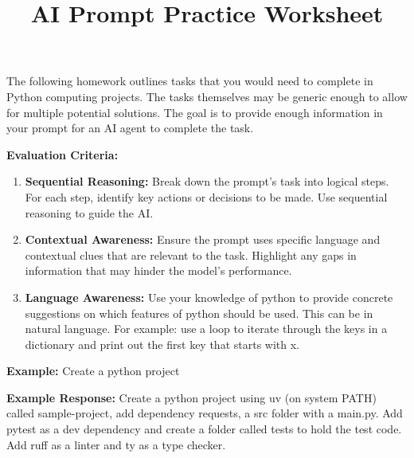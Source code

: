\documentclass[12pt]{article}
\title{\textbf{AI Prompt Practice Worksheet}}
\date{}
\begin{document}
\maketitle
\thispagestyle{empty}

\begin{mdframed}
The following homework outlines tasks that you would need to complete in Python computing projects. The tasks themselves may be generic enough to allow for multiple potential solutions. The goal is to provide enough information in your prompt for an AI agent to complete the task.

\medskip
\noindent\textbf{Evaluation Criteria:}
\begin{enumerate}[leftmargin=*, label=\arabic*.]
    \item \textbf{Sequential Reasoning:} Break down the prompt's task into logical steps. For each step, identify key actions or decisions to be made. Use sequential reasoning to guide the AI.

    \item \textbf{Contextual Awareness:} Ensure the prompt uses specific language and contextual clues that are relevant to the task. Highlight any gaps in information that may hinder the model's performance.
    
     \item \textbf{Language Awareness:} Use your knowledge of python to provide concrete suggestions on which features of python should be used.  This can be in natural language.  For example: use a loop to iterate through the keys in a dictionary and print out the first key that starts with x.
\end{enumerate}
\end{mdframed}

\bigskip

\begin{mdframed}[backgroundcolor=gray!15]
\noindent\textbf{Example:} Create a python project

\medskip
\noindent\textbf{Example Response:} Create a python project using uv (on system PATH) called sample-project, add dependency requests, a src folder with a main.py. Add pytest as a dev dependency and create a folder called tests to hold the test code. Add ruff as a linter and ty as a type checker.
\end{mdframed}
\end{document}

